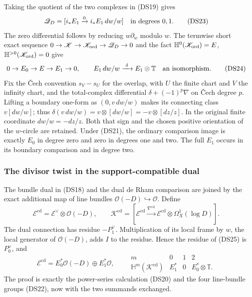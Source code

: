 Taking the quotient of the two complexes in (DS19) gives
\[
 \mathscr Q_D=[i_*E_1\xrightarrow{0}i_*E_1\,dw/w]
 \quad\hbox{in degrees }0,1.
 \tag{DS23}
\]
The zero differential follows by reducing $w\partial_w$ modulo $w$.
The termwise short exact sequence
$0\to\mathscr K\to\mathscr K_{\rm ord}\to\mathscr Q_D\to0$
and the fact $\mathbb H^0(\mathscr K_{\rm ord})=E$,
$\mathbb H^{>0}(\mathscr K_{\rm ord})=0$ give
\[
0\to E_0\to E\to E_1\to0,
\qquad
 E_1\,dw/w\xrightarrow{\ \delta\ }E_1\otimes\mathbb T
 \quad\hbox{an isomorphism}.
 \tag{DS24}
\]
Fix the \v Cech convention $s_V-s_U$ for the overlap, with $U$ the
finite chart and $V$ the infinity chart, and the total-complex
differential $\delta+(-1)^p\nabla$ on \v Cech degree $p$.
Lifting a boundary one-form
as $(0,v\,dw/w)$ makes its connecting class $v[dw/w]$; thus
$\delta(v\,dw/w)=v\otimes[dw/w]=-v\otimes[dz/z]$.  In the original finite coordinate
$dw/w=-dz/z$.  Both that sign and the chosen positive orientation of
the $w$-circle are retained.  Under (DS21), the ordinary comparison
image is exactly $E_0$ in degree zero and zero in degrees one and two.
The full $E_1$ occurs in its boundary comparison and in degree two.

\subsubsection{The divisor twist in the support-compatible dual}

The bundle dual in (DS18) and the dual de Rham comparison are joined
by the exact additional map of line bundles
$\mathcal O(-D)\hookrightarrow\mathcal O$.  Define
\[
 \mathscr E^{\mathrm{cd}}=\mathscr E^\vee\otimes\mathcal O(-D),
 \qquad
 \mathscr K^{\mathrm{cd}}=
 [\mathscr E^{\mathrm{cd}}\xrightarrow{\nabla^{\mathrm{cd}}}
  \mathscr E^{\mathrm{cd}}\otimes\Omega_X^1(\log D)].
 \tag{DS25}
\]
The dual connection has residue $-P_1^\vee$.  Multiplication of its
local frame by $w$, the local generator of $\mathcal O(-D)$, adds
$I$ to the residue.  Hence the residue of (DS25) is $P_0^\vee$,
and
\[
 \mathscr E^{\mathrm{cd}}
 =E_0^*\mathcal O(-D)\oplus E_1^*\mathcal O,
 \qquad
 \begin{array}{c|ccc}
 m&0&1&2\\\hline
 \mathbb H^m(\mathscr K^{\mathrm{cd}})&E_1^*&0&E_0^*\otimes\mathbb T.
 \end{array}
 \tag{DS26}
\]
The proof is exactly the power-series calculation (DS20) and the
four line-bundle groups (DS22), now with the two summands exchanged.

